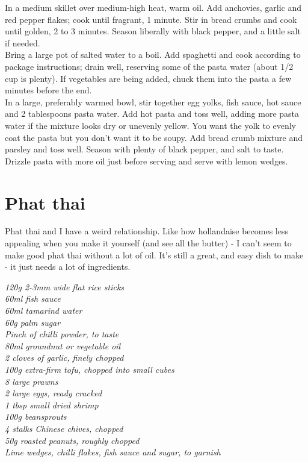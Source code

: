 \documentclass{tufte-book}
\begin{document}
\smallskip
In a medium skillet over medium-high heat, warm oil. Add anchovies, garlic and red pepper flakes; cook until fragrant, 1 minute. Stir in bread crumbs and cook until golden, 2 to 3 minutes. Season liberally with black pepper, and a little salt if needed.
\\Bring a large pot of salted water to a boil. Add spaghetti and cook according to package instructions; drain well, reserving some of the pasta water (about 1/2 cup is plenty). If vegetables are being added, chuck them into the pasta a few minutes before the end.
\\In a large, preferably warmed bowl, stir together egg yolks, fish sauce, hot sauce and 2 tablespoons pasta water. Add hot pasta and toss well, adding more pasta water if the mixture looks dry or unevenly yellow. You want the yolk to evenly coat the pasta but you don't want it to be soupy. Add bread crumb mixture and parsley and toss well. Season with plenty of black pepper, and salt to taste. Drizzle pasta with more oil just before serving and serve with lemon wedges.


\section{Phat thai}

Phat thai and I have a weird relationship. Like how hollandaise becomes less appealing when you make it yourself (and see all the butter) - I can't seem to make good phat thai without a lot of oil. It's still a great, and easy dish to make - it just needs a lot of ingredients.

\smallskip
\emph{120g 2-3mm wide flat rice sticks
\\60ml fish sauce
\\60ml tamarind water
\\60g palm sugar
\\Pinch of chilli powder, to taste
\\80ml groundnut or vegetable oil
\\2 cloves of garlic, finely chopped
\\100g extra-firm tofu, chopped into small cubes
\\8 large prawns
\\2 large eggs, ready cracked
\\1 tbsp small dried shrimp
\\100g beansprouts
\\4 stalks Chinese chives, chopped
\\50g roasted peanuts, roughly chopped
\\Lime wedges, chilli flakes, fish sauce and sugar, to garnish}
\end{document}

